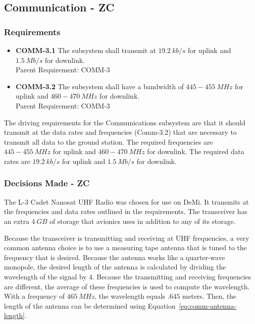 \documentclass[12pt]{article}
\begin{document}
\newpage
\FloatBarrier
		\subsection{Communication - ZC}

			\subsubsection{Requirements}
			
\begin{itemize}
\item \textbf{COMM-3.1} The subsystem shall transmit at $19.2\ kb/s$ for uplink and $1.5\ Mb/s$ for downlink. \\
Parent Requirement: COMM-3
\item \textbf{COMM-3.2} The subsystem shall have a bandwidth of $445-455\ MHz$ for uplink and $460-470\ MHz$ for downlink. \\
Parent Requirement: COMM-3
\end{itemize}

The driving requirements for the Communications subsystem are that it should transmit at the data rates and frequencies (Comm-3.2) that are necessary to transmit all data to the ground station. The required frequencies are $445-455\ MHz$ for uplink and $460-470\ MHz$ for downlink. The required data rates are $19.2\ kb/s$ for uplink and $1.5\ Mb/s$ for downlink.

			\subsubsection{Decisions Made - ZC}\label{sec:comm_decisions}

The L-3 Cadet Nanosat UHF Radio was chosen for use on DeMi. It transmits at the frequencies and data rates outlined in the requirements. The transceiver has an extra $4\ GB$ of storage that avionics uses in addition to any of its storage. 

Because the transceiver is transmitting and receiving at UHF frequencies, a very common antenna choice is to use a measuring tape antenna that is tuned to the frequency that is desired. Because the antenna works like a quarter-wave monopole, the desired length of the antenna is calculated by dividing the wavelength of the signal by 4. Because the transmitting and receiving frequencies are different, the average of these frequencies is used to compute the wavelength. With a frequency of $465\ MHz$, the wavelength equals $.645$ meters. Then, the length of the antenna can be determined using Equation~\ref{eq:comm-antenna-length}.
\end{document}
